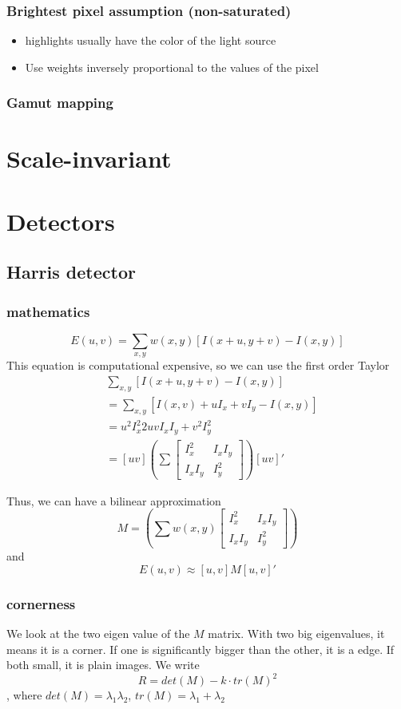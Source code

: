\documentclass[11pt]{article}
\begin{document}
\subsubsection{Brightest pixel assumption (non-saturated)}
\label{sec:orge741d15}
\begin{itemize}
\item highlights usually have the color of the light source
\item Use weights inversely proportional to the values of the pixel
\end{itemize}
\subsubsection{Gamut mapping}
\label{sec:orge68e53c}
\section{Scale-invariant}
\label{sec:orgca9d768}
\section{Detectors}
\label{sec:org90ebc1c}
\subsection{Harris detector}
\label{sec:org96b1669}
\subsubsection{mathematics}
\label{sec:org1562141}
\[ E(u, v) = \sum_{x, y} w(x, y) [I(x + u, y + v) - I(x, y)]\]
This equation is computational expensive, so we can use the first order Taylor
\begin{align*}
&\sum_{x, y} [I(x + u, y + v) - I(x, y)] \\
&= \sum_{x, y} [I(x,v) + u I_x + v I_y - I(x, y)] \\
&= u^2 I_x^2  2 u v I_x I_y + v^2 I_y^2 \\
&= [u v] (\sum \begin{bmatrix} I_x^2 & I_x I_y \\ I_x I_y & I_y^2 \end{bmatrix}) [u v]'
\end{align*}

Thus, we can have a bilinear approximation
\[ M = (\sum w(x,y) \begin{bmatrix} I_x^2 & I_x I_y \\ I_x I_y & I_y^2 \end{bmatrix})  \]
and 
\[ E(u, v) \approx [u, v] M [u, v]' \]
\subsubsection{cornerness}
\label{sec:org77ada36}
We look at the two eigen value of the \(M\) matrix. With two big eigenvalues,
it means it is a corner. If one is significantly bigger than the other, it is
a edge. If both small, it is plain images.
We write
\[ R = det(M) - k \cdot tr(M)^2 \], where \(det(M) = \lambda_1 \lambda_2\),
\(tr(M) = \lambda_1 + \lambda_2\)
\subsection{}
\label{sec:org5b773d9}
\end{document}
